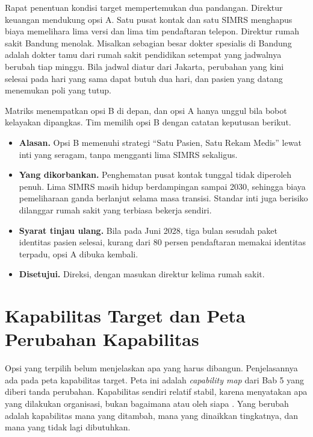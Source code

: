 \begin{kasus}[title={Kasus Medikara Health: Sentralisasi Penuh atau Inti yang Distandarkan},
              parbox=false]
  Rapat penentuan kondisi target mempertemukan dua pandangan. Direktur keuangan mendukung
  opsi A. Satu pusat kontak dan satu SIMRS menghapus biaya memelihara lima versi dan lima
  tim pendaftaran telepon. Direktur rumah sakit Bandung menolak. Misalkan sebagian besar
  dokter spesialis di Bandung adalah dokter tamu dari rumah sakit pendidikan setempat yang
  jadwalnya berubah tiap minggu. Bila jadwal diatur dari Jakarta, perubahan yang kini
  selesai pada hari yang sama dapat butuh dua hari, dan pasien yang datang menemukan poli
  yang tutup.

  Matriks menempatkan opsi B di depan, dan opsi A hanya unggul bila bobot kelayakan
  dipangkas. Tim memilih opsi B dengan catatan keputusan berikut.

  \begin{itemize}
    \item \textbf{Alasan.} Opsi B memenuhi strategi ``Satu Pasien, Satu Rekam Medis'' lewat
          inti yang seragam, tanpa mengganti lima SIMRS sekaligus.
    \item \textbf{Yang dikorbankan.} Penghematan pusat kontak tunggal tidak diperoleh
          penuh. Lima SIMRS masih hidup berdampingan sampai 2030, sehingga biaya
          pemeliharaan ganda berlanjut selama masa transisi. Standar inti juga berisiko
          dilanggar rumah sakit yang terbiasa bekerja sendiri.
    \item \textbf{Syarat tinjau ulang.} Bila pada Juni 2028, tiga bulan sesudah paket
          identitas pasien selesai, kurang dari 80 persen pendaftaran memakai identitas
          terpadu, opsi A dibuka kembali.
    \item \textbf{Disetujui.} Direksi, dengan masukan direktur kelima rumah sakit.
  \end{itemize}
\end{kasus}

\section{Kapabilitas Target dan Peta Perubahan Kapabilitas}

Opsi yang terpilih belum menjelaskan apa yang harus dibangun. Penjelasannya ada pada peta
kapabilitas target. Peta ini adalah \textit{capability map} dari Bab 5 yang diberi tanda
perubahan. Kapabilitas sendiri relatif stabil, karena menyatakan apa yang dilakukan
organisasi, bukan bagaimana atau oleh siapa \cite{c08-togaf-g211,bizbok15}. Yang berubah
adalah kapabilitas mana yang ditambah, mana yang dinaikkan tingkatnya, dan mana yang tidak
lagi dibutuhkan.

